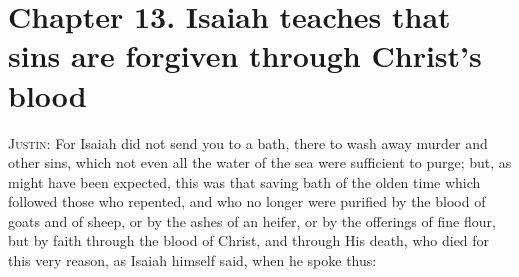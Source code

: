 \documentclass[9pt, twocolumn, oneside, a4paper]{memoir}
\begin{document}
\section*{Chapter 13. Isaiah teaches that sins are forgiven through Christ's blood}

\textsc{Justin:} For Isaiah did not send you to a bath, there to wash away murder and other sins, which not even all the water of the sea were sufficient to purge; but, as might have been expected, this was that saving bath of the olden time which followed  those who repented, and who no longer were purified by the blood of goats and of sheep, or by the ashes of an heifer, or by the offerings of fine flour, but by faith through the blood of Christ, and through His death, who died for this very reason, as Isaiah himself said, when he spoke thus:
\end{document}
